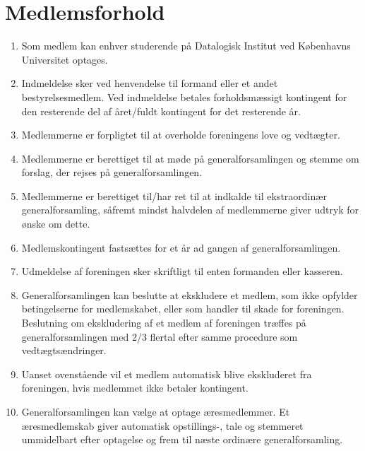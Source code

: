 \documentclass[a4paper, 10pt]{article}
\newenvironment{stykenum}{
  \begin{enumerate}[%
    label=Stk.~\arabic*:, ref=\textsection~\theenumi~Stk.~\arabic*, start=1]
}{\end{enumerate}}
\begin{document}
\section{Medlemsforhold}
\begin{stykenum}
    \item Som medlem kan enhver studerende på Datalogisk Institut ved Københavns
        Universitet optages.

    \item Indmeldelse sker ved henvendelse til formand eller et andet
        bestyrelsesmedlem. Ved indmeldelse betales forholdsmæssigt kontingent
        for den resterende del af året/fuldt kontingent for det resterende år.

    \item Medlemmerne er forpligtet til at overholde foreningens love og
        vedtægter.

    \item Medlemmerne er berettiget til at møde på generalforsamlingen og stemme
        om forslag, der rejses på generalforsamlingen.

    \item Medlemmerne er berettiget til/har ret til at indkalde til
        ekstraordinær generalforsamling, såfremt mindst halvdelen af medlemmerne
        giver udtryk for ønske om dette.

    \item Medlemskontingent fastsættes for et år ad gangen af
        generalforsamlingen.

    \item Udmeldelse af foreningen sker skriftligt til enten formanden eller
        kasseren.

    \item Generalforsamlingen kan beslutte at ekskludere et medlem, som ikke
        opfylder betingelserne for medlemskabet, eller som handler til skade for
        foreningen. Beslutning om ekskludering af et medlem af foreningen
        træffes på generalforsamlingen med 2/3 flertal efter samme procedure som
        vedtægtsændringer.

    \item Uanset ovenstående vil et medlem automatisk blive ekskluderet fra
        foreningen, hvis medlemmet ikke betaler kontingent.

    \item Generalforsamlingen kan vælge at optage æresmedlemmer. Et
        æresmedlemskab giver automatisk opstillings-, tale og stemmeret
        ummidelbart efter optagelse og frem til næste ordinære
        generalforsamling.
\end{stykenum}
\end{document}

